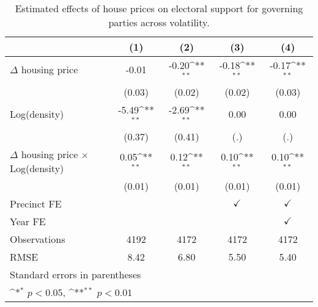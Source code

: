 \begin{table}[htbp]\centering
\def\sym#1{\ifmmode^{#1}\else\(^{#1}\)\fi}
\caption{Estimated effects of house prices on electoral support for governing parties across volatility.} \label{predens}
\begin{tabular}{l*{4}{c}}
\hline\hline
                    &\multicolumn{1}{c}{(1)}        &\multicolumn{1}{c}{(2)}        &\multicolumn{1}{c}{(3)}        &\multicolumn{1}{c}{(4)}        \\
\hline
$\Delta$ housing price&       -0.01        &       -0.20\sym{**}&       -0.18\sym{**}&       -0.17\sym{**}\\
                    &      (0.03)        &      (0.02)        &      (0.02)        &      (0.03)        \\
[1em]
Log(density)        &       -5.49\sym{**}&       -2.69\sym{**}&        0.00        &        0.00        \\
                    &      (0.37)        &      (0.41)        &         (.)        &         (.)        \\
[1em]
$\Delta$ housing price $\times$ Log(density)&        0.05\sym{**}&        0.12\sym{**}&        0.10\sym{**}&        0.10\sym{**}\\
                    &      (0.01)        &      (0.01)        &      (0.01)        &      (0.01)        \\
[1em]
\hline Precinct FE  &                    &                    &$\checkmark$        &$\checkmark$        \\
[1em]
Year FE             &                    &                    &                    &$\checkmark$        \\
\hline
Observations        &        4192        &        4172        &        4172        &        4172        \\
RMSE                &        8.42        &        6.80        &        5.50        &        5.40        \\
\hline\hline
\multicolumn{5}{l}{\footnotesize Standard errors in parentheses}\\
\multicolumn{5}{l}{\footnotesize \sym{*} \(p<0.05\), \sym{**} \(p<0.01\)}\\
\end{tabular}
\end{table}
